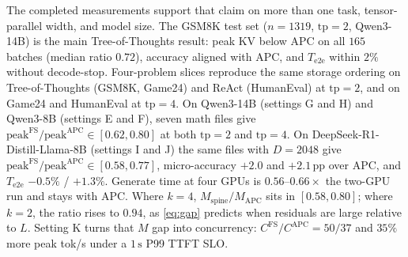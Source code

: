 \documentclass[11pt,a4paper]{article}
\begin{document}
The completed measurements support that claim on more than one task, tensor-parallel width, and model size.
The GSM8K test set ($n{=}1319$, $\mathrm{tp}{=}2$, Qwen3-14B) is the main Tree-of-Thoughts result: peak KV below APC on all $165$ batches (median ratio $0.72$), accuracy aligned with APC, and $T_{\mathrm{e2e}}$ within $2\%$ without decode-stop.
Four-problem slices reproduce the same storage ordering on Tree-of-Thoughts (GSM8K, Game24) and ReAct (HumanEval) at $\mathrm{tp}{=}2$, and on Game24 and HumanEval at $\mathrm{tp}{=}4$.
On Qwen3-14B (settings G and H) and Qwen3-8B (settings E and F), seven math files give $\mathrm{peak}^{\mathrm{FS}}/\mathrm{peak}^{\mathrm{APC}}\in[0.62,0.80]$ at both $\mathrm{tp}{=}2$ and $\mathrm{tp}{=}4$.
On DeepSeek-R1-Distill-Llama-8B (settings I and J) the same files with $D{=}2048$ give $\mathrm{peak}^{\mathrm{FS}}/\mathrm{peak}^{\mathrm{APC}}\in[0.58,0.77]$, micro-accuracy $+2.0$ and $+2.1$\,pp over APC, and $T_{\mathrm{e2e}}$ $-0.5\%$ / $+1.3\%$.
Generate time at four GPUs is $0.56$--$0.66\times$ the two-GPU run and stays with APC.
Where $k{=}4$, $M_{\mathrm{spine}}/M_{\mathrm{APC}}$ sits in $[0.58,0.80]$; where $k{=}2$, the ratio rises to $0.94$, as \eqref{eq:gap} predicts when residuals are large relative to $L$.
Setting K turns that $M$ gap into concurrency: $C^{\mathrm{FS}}/C^{\mathrm{APC}}{=}50/37$ and $35\%$ more peak tok/s under a $1\,\mathrm{s}$ P99 TTFT SLO.
\end{document}
